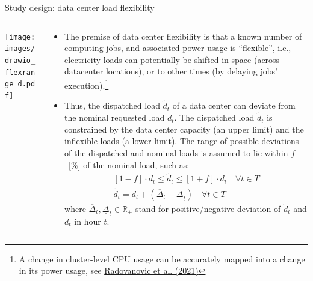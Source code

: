 \begin{frame}{Study design: data center load flexibility}

  {\footnotesize
    \begin{columns}[T]
  
    \begin{column}{6cm}
    \centering
    \vspace{0.2cm}
    \texttt{[image: images/drawio\_flexrange\_d.pdf]}
    \end{column}
  
    \begin{column}{9cm}
    \begin{itemize}
    \vspace{-0.1cm}
    \item The premise of data center flexibility is that a known number of computing jobs, and associated power usage is \enquote{flexible}, i.e., electricity loads can potentially be shifted in space (across datacenter locations), or to other times (by delaying jobs' execution).\footnote{{\scriptsize A change in cluster-level CPU usage can be accurately mapped into a change in its power usage, see \href{https://arxiv.org/abs/2106.11750}{Radovanovic et al. (2021)}}}
  
    \item Thus, the \alert{dispatched load $\widetilde{d}_t$} of a data center can deviate from the nominal requested load $d_t$. The dispatched load $\widetilde{d}_t$ is constrained by the data center capacity (an upper limit) and the inflexible loads (a lower limit). The range of possible deviations of the dispatched and nominal loads is assumed to lie within $f$~[\%] of the nominal load, such as:
    \begin{subequations}
      \begin{align}
        [1-f] \cdot d_t \le  \widetilde{d}_t  \le [1+f] \cdot d_t \quad \forall t \in T  
        \label{eqn:range} \\
        \widetilde{d}_t = d_t + (\overline{\Delta}_t - \underline{\Delta}_t) \quad \forall t \in T  
        \label{eqn:widetilde}
      \end{align}
    \end{subequations}
    \noindent where $\overline{\Delta}_t, \underline{\Delta}_t \in \mathbb{R}_{+}$ stand for positive/negative deviation of $\widetilde{d}_t$ and $d_t$ in hour $t$.
    \end{itemize}
  
    \end{column}
    \end{columns}
  }
  \end{frame}



